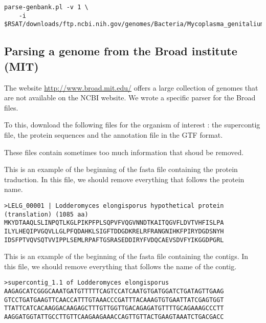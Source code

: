 \begin{footnotesize}
\begin{verbatim}
parse-genbank.pl -v 1 \
    -i $RSAT/downloads/ftp.ncbi.nih.gov/genomes/Bacteria/Mycoplasma_genitalium 
\end{verbatim}
\end{footnotesize}

\subsection{Parsing a genome from the Broad institute (MIT)}

The website \url{http://www.broad.mit.edu/} offers a large collection of
genomes that are not available on the NCBI website. We wrote a specific parser 
for the Broad files.

To this, download the following files for the organism of interest : the supercontig file, the protein sequences and the annotation file in the GTF format.

These files contain sometimes too much information that shoud be removed. 

This is an example of the beginning of the fasta file containing the protein traduction. In this file, we should remove 
everything that follows the protein name.
\begin{footnotesize}
\begin{verbatim}
>LELG_00001 | Lodderomyces elongisporus hypothetical protein (translation) (1085 aa)
MKYDTAAQLSLINPQTLKGLPIKPFPLSQPVFVQGVNNDTKAITQGVFLDVTVHFISLPA
ILYLHEQIPVGQVLLGLPFQDAHKLSIGFTDDGDKRELRFRANGNIHKFPIRYDGDSNYH
IDSFPTVQVSQTVVIPPLSEMLRPAFTGSRASEDDIRYFVDQCAEVSDVFYIKGGDPGRL
\end{verbatim}
\end{footnotesize}
This is an example of the beginning of the fasta file containing the contigs. In this file, we should remove 
everything that follows the name of the contig. 
\begin{footnotesize}
\begin{verbatim}
>supercontig_1.1 of Lodderomyces elongisporus
AAGAGCATCGGGCAAATGATGTTTTTCAGTCCATCAATGTGATGGATCTGATAGTTGAAG
GTCCTGATGAAGTTCAACCATTTGTAAACCCGATTTACAAAGTGTGAATTATCGAGTGGT
TTATTCATCACAAGGACAAGAGCTTTGTTGGTTGACAGAGATGTTTTGCAGAAAGCCCTT
AAGGATGGTATTGCCTTGTTCAAGAAGAAACCAGTTGTTACTGAAGTAAATCTGACGACC
\end{verbatim}
\end{footnotesize}


